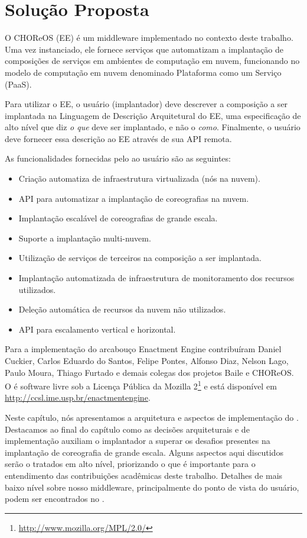 \chapter{Solução Proposta}
\label{cap:solucao}

O CHOReOS \ee (EE) é um middleware implementado no contexto deste trabalho.
Uma vez instanciado, ele fornece serviços que automatizam
a implantação de composições de serviços em ambientes de computação em nuvem,
funcionando no modelo de computação em nuvem denominado Plataforma como um Serviço (PaaS).

Para utilizar o EE, o usuário (implantador) deve descrever a composição a ser implantada
na Linguagem de Descrição Arquitetural do EE, uma especificação de alto nível que
diz \emph{o que} deve ser implantado, e não o \emph{como}. 
Finalmente, o usuário deve fornecer essa descrição ao EE através de sua API remota.

As funcionalidades fornecidas pelo \ee ao usuário são as seguintes:

\begin{itemize}
\item Criação automatiza de infraestrutura virtualizada (nós na nuvem).
\item API para automatizar a implantação de coreografias na nuvem.
\item Implantação escalável de coreografias de grande escala.
\item Suporte a implantação multi-nuvem.
\item Utilização de serviços de terceiros na composição a ser implantada.
\item Implantação automatizada de infraestrutura de monitoramento dos recursos utilizados.
\item Deleção automática de recursos da nuvem não utilizados.
\item API para escalamento vertical e horizontal.
\end{itemize}

Para a implementação do arcabouço Enactment Engine contribuíram Daniel Cuckier, Carlos Eduardo do Santos, Felipe Pontes, Alfonso Diaz, Nelson Lago, Paulo Moura, Thiago Furtado e demais colegas dos projetos Baile e CHOReOS. O \ee é software livre 
sob a Licença Pública da Mozilla 2\footnote{\url{http://www.mozilla.org/MPL/2.0/}} 
e está disponível em \url{http://ccsl.ime.usp.br/enactmentengine}. 

Neste capítulo, nós apresentamos a arquitetura e aspectos de implementação do \ee.   
Destacamos ao final do capítulo
como as decisões arquiteturais e de implementação auxiliam o implantador
a superar os desafios presentes na implantação de coreografia de grande escala.
Alguns aspectos aqui discutidos serão o tratados em alto nível,
priorizando o que é importante para o entendimento das contribuições
acadêmicas deste trabalho.
Detalhes de mais baixo nível sobre nosso middleware, principalmente do ponto de vista do
usuário, podem ser encontrados no \userguide.

